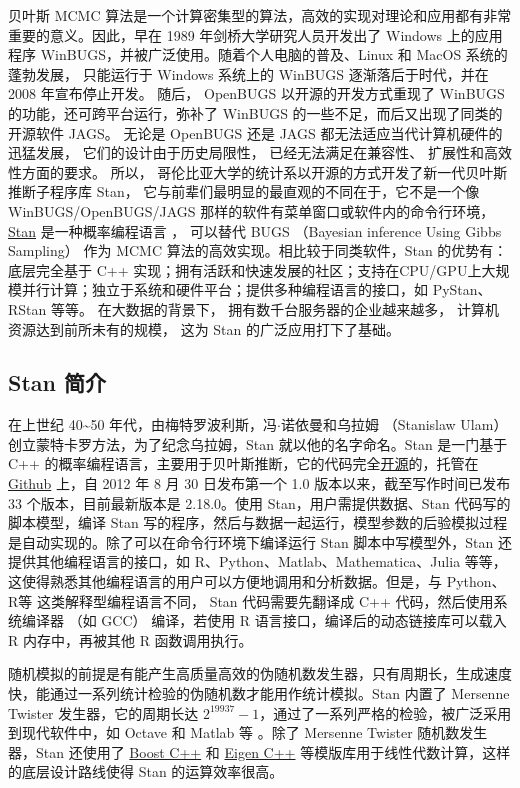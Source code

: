 \documentclass[12pt,a4paper,UTF8,twoside]{book}
\theoremstyle{definition}
\theoremstyle{definition}
\theoremstyle{definition}
\theoremstyle{remark}
\begin{document}
贝叶斯 MCMC 算法是一个计算密集型的算法，高效的实现对理论和应用都有非常重要的意义。因此，早在 1989 年剑桥大学研究人员开发出了 Windows 上的应用程序 WinBUGS，并被广泛使用。随着个人电脑的普及、Linux 和 MacOS 系统的蓬勃发展， 只能运行于 Windows 系统上的 WinBUGS 逐渐落后于时代，并在 2008 年宣布停止开发。 随后， OpenBUGS 以开源的开发方式重现了 WinBUGS 的功能，还可跨平台运行，弥补了 WinBUGS 的一些不足，而后又出现了同类的开源软件 JAGS。 无论是 OpenBUGS 还是 JAGS 都无法适应当代计算机硬件的迅猛发展， 它们的设计由于历史局限性， 已经无法满足在兼容性、 扩展性和高效性方面的要求。 所以， 哥伦比亚大学的统计系以开源的方式开发了新一代贝叶斯推断子程序库 Stan， 它与前辈们最明显的最直观的不同在于，它不是一个像 WinBUGS/OpenBUGS/JAGS 那样的软件有菜单窗口或软件内的命令行环境， \href{http://mc-stan.org/}{Stan} 是一种概率编程语言 \citep{Stan2017JSS}， 可以替代 BUGS （Bayesian inference Using Gibbs Sampling） \citep{BUGS2009} 作为 MCMC 算法的高效实现。相比较于同类软件，Stan 的优势有：底层完全基于 C++ 实现；拥有活跃和快速发展的社区；支持在CPU/GPU上大规模并行计算；独立于系统和硬件平台；提供多种编程语言的接口，如 PyStan、 RStan 等等。 在大数据的背景下， 拥有数千台服务器的企业越来越多， 计算机资源达到前所未有的规模， 这为 Stan 的广泛应用打下了基础。

\hypertarget{subsec:stan-samplers}{%
\subsection{Stan 简介}\label{subsec:stan-samplers}}

在上世纪 40\textasciitilde{}50 年代，由梅特罗波利斯，冯\(\cdot\)诺依曼和乌拉姆 （Stanislaw Ulam） 创立蒙特卡罗方法，为了纪念乌拉姆，Stan 就以他的名字命名。Stan 是一门基于 C++ 的概率编程语言，主要用于贝叶斯推断，它的代码完全\href{http://mc-stan.org/}{开源}的，托管在 \href{https://github.com/stan-dev/stan}{Github} 上，自 2012 年 8 月 30 日发布第一个 1.0 版本以来，截至写作时间已发布 33 个版本，目前最新版本是 2.18.0。使用 Stan，用户需提供数据、Stan 代码写的脚本模型，编译 Stan 写的程序，然后与数据一起运行，模型参数的后验模拟过程是自动实现的。除了可以在命令行环境下编译运行 Stan 脚本中写模型外，Stan 还提供其他编程语言的接口，如 R、Python、Matlab、Mathematica、Julia 等等，这使得熟悉其他编程语言的用户可以方便地调用和分析数据。但是，与 Python、R等 这类解释型编程语言不同， Stan 代码需要先翻译成 C++ 代码，然后使用系统编译器 （如 GCC） 编译，若使用 R 语言接口，编译后的动态链接库可以载入 R 内存中，再被其他 R 函数调用执行。

随机模拟的前提是有能产生高质量高效的伪随机数发生器，只有周期长，生成速度快，能通过一系列统计检验的伪随机数才能用作统计模拟。Stan 内置了 Mersenne Twister 发生器，它的周期长达 \(2^{19937}-1\)，通过了一系列严格的检验，被广泛采用到现代软件中，如 Octave 和 Matlab 等 \citep{Huang2017COS}。除了 Mersenne Twister 随机数发生器，Stan 还使用了 \href{https://www.boost.org/}{Boost C++} 和 \href{http://eigen.tuxfamily.org/index.php?title=Main_Page}{Eigen C++} 等模版库用于线性代数计算，这样的底层设计路线使得 Stan 的运算效率很高。
\end{document}

